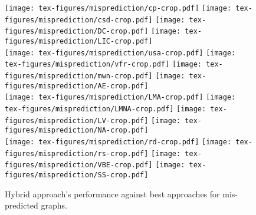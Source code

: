 \begin{figure}[h]
\centering

\texttt{[image: tex-figures/misprediction/cp-crop.pdf]}
\label{fig:mis-cp}
\texttt{[image: tex-figures/misprediction/csd-crop.pdf]}
\label{fig:mis-csd}
\texttt{[image: tex-figures/misprediction/DC-crop.pdf]}
\label{fig:mis-dc}
\texttt{[image: tex-figures/misprediction/LIC-crop.pdf]}
\label{fig:mis-lic}
\\
\texttt{[image: tex-figures/misprediction/usa-crop.pdf]}
\label{fig:mis-use}
	\texttt{[image: tex-figures/misprediction/vfr-crop.pdf]}
	\label{fig:mis-vfr}
	\texttt{[image: tex-figures/misprediction/mwn-crop.pdf]}
	\label{fig:mis-mwn}
\texttt{[image: tex-figures/misprediction/AE-crop.pdf]}
\label{fig:mis-ae}
\\
\texttt{[image: tex-figures/misprediction/LMA-crop.pdf]}
\label{fig:mis-lma}
\texttt{[image: tex-figures/misprediction/LMNA-crop.pdf]}
\label{fig:mis-lmna}
\texttt{[image: tex-figures/misprediction/LV-crop.pdf]}
\label{fig:mis-lv}
\texttt{[image: tex-figures/misprediction/NA-crop.pdf]}
\label{fig:mis-na}
\\
\texttt{[image: tex-figures/misprediction/rd-crop.pdf]}
\label{fig:mis-rd}
\texttt{[image: tex-figures/misprediction/rs-crop.pdf]}
\label{fig:mis-rs}
\texttt{[image: tex-figures/misprediction/VBE-crop.pdf]}
\label{fig:mis-vbe}
	\texttt{[image: tex-figures/misprediction/SS-crop.pdf]}
	\label{fig:mis-ss}
\\
\caption{Hybrid approach's performance against best approaches for mis-predicted graphs.}
\label{fig:mis-graph}
\end{figure}

